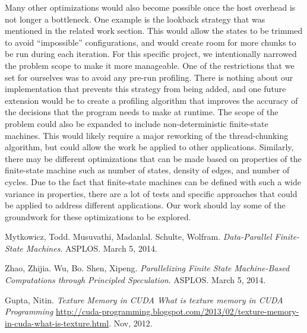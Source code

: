 \documentclass[11pt]{sigplanconf}
\begin{document}
Many other optimizations would also become possible once the host overhead is not longer a bottleneck. One example is the lookback strategy that was mentioned in the related work section. This would allow the states to be trimmed to avoid ``impossible'' configurations, and would create room for more chunks to be run during each iteration. For this specific project, we intentionally narrowed the problem scope to make it more manageable. One of the restrictions that we set for ourselves was to avoid any pre-run profiling. There is nothing about our implementation that prevents this strategy from being added, and one future extension would be to create a profiling algorithm that improves the accuracy of the decisions that the program needs to make at runtime. The scope of the problem could also be expanded to include non-deterministic finite-state machines. This would likely require a major reworking of the thread-chunking algorithm, but could allow the work be applied to other applications. Similarly, there may be different optimizations that can be made based on properties of the finite-state machine such as number of states, density of edges, and number of cycles. Due to the fact that finite-state machines can be defined with such a wide variance in properties, there are a lot of tests and specific approaches that could be applied to address different applications. Our work should lay some of the groundwork for these optimizations to be explored.


\begin{thebibliography}{9}
\softraggedright

 Mytkowicz, Todd. Musuvathi, Madanlal. Schulte, Wolfram. \textit{Data-Parallel Finite-State Machines}. ASPLOS. March 5, 2014.

 Zhao, Zhijia. Wu, Bo. Shen, Xipeng. \textit{Parallelizing Finite State Machine-Based Computations through Principled Speculation}. ASPLOS. March 5, 2014.

 Gupta, Nitin. \textit{Texture Memory in CUDA\: What is texture memory in CUDA Programming} \url{http://cuda-programming.blogspot.com/2013/02/texture-memory-in-cuda-what-is-texture.html}. Nov, 2012.

\end{thebibliography}
\end{document}
